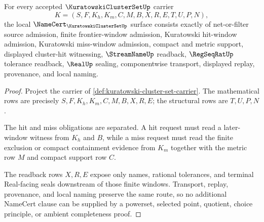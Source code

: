 \begin{theorem}
\label{thm:kuratowski-cluster-set-namecert-obligations}
For every accepted $\KuratowskiClusterSetUp$ carrier
$$
K=(S,F,K_h,K_m,C,M,B,X,R,E,T,U,P,N),
$$
the local $\NameCert_{\KuratowskiClusterSetUp}$ surface consists exactly of net-or-filter source admission, finite frontier-window admission, Kuratowski hit-window admission, Kuratowski miss-window admission, compact and metric support, displayed cluster-hit witnessing, $\StreamNameUp$ readback, $\RegSeqRatUp$ tolerance readback, $\RealUp$ sealing, componentwise transport, displayed replay, provenance, and local naming.
\end{theorem}
\begin{proof}
Project the carrier of \autoref{def:kuratowski-cluster-set-carrier}. The mathematical rows are precisely $S,F,K_h,K_m,C,M,B,X,R,E$; the structural rows are $T,U,P,N$.

The hit and miss obligations are separated. A hit request must read a later-window witness from $K_h$ and $B$, while a miss request must read the finite exclusion or compact containment evidence from $K_m$ together with the metric row $M$ and compact support row $C$.

The readback rows $X,R,E$ expose only names, rational tolerances, and terminal Real-facing seals downstream of those finite windows. Transport, replay, provenance, and local naming preserve the same route, so no additional NameCert clause can be supplied by a powerset, selected point, quotient, choice principle, or ambient completeness proof.
\end{proof}

